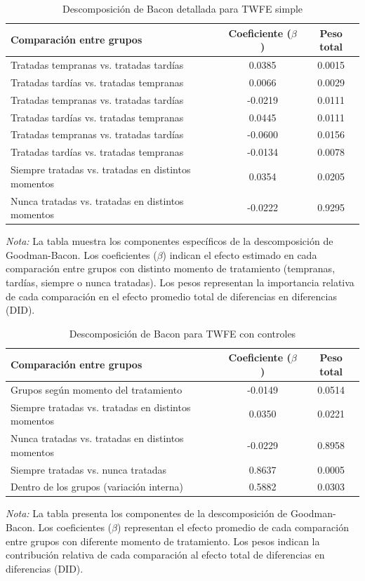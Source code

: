 \documentclass{article}
\begin{document}
\begin{table}[H]
\centering
\caption{Descomposición de Bacon detallada para TWFE simple}
\label{tab:bacon_detallada}
\begin{tabular}{lcc}
\hline
\hline
\textbf{Comparación entre grupos} & \textbf{Coeficiente ($\beta$)} & \textbf{Peso total} \\
\hline
Tratadas tempranas vs. tratadas tardías  & 0.0385 & 0.0015 \\
Tratadas tardías vs. tratadas tempranas  & 0.0066 & 0.0029 \\
Tratadas tempranas vs. tratadas tardías  & -0.0219 & 0.0111 \\
Tratadas tardías vs. tratadas tempranas  & 0.0445 & 0.0111 \\
Tratadas tempranas vs. tratadas tardías  & -0.0600 & 0.0156 \\
Tratadas tardías vs. tratadas tempranas & -0.0134 & 0.0078 \\
Siempre tratadas vs. tratadas en distintos momentos & 0.0354 & 0.0205 \\
Nunca tratadas vs. tratadas en distintos momentos & -0.0222 & 0.9295 \\
\hline
\end{tabular}
\parbox[t]{\textwidth}{%
\vspace{0.5em}
\footnotesize{\textit{Nota:} La tabla muestra los componentes específicos de la descomposición de Goodman-Bacon. Los coeficientes ($\beta$) indican el efecto estimado en cada comparación entre grupos con distinto momento de tratamiento (tempranas, tardías, siempre o nunca tratadas). Los pesos representan la importancia relativa de cada comparación en el efecto promedio total de diferencias en diferencias (DID).}}
\end{table}

\begin{table}[H]
\centering
\caption{Descomposición de Bacon para TWFE con controles}
\label{tab:bacon_descomposicion}
\begin{tabular}{lcc}
\hline
\hline
\textbf{Comparación entre grupos} & \textbf{Coeficiente ($\beta$)} & \textbf{Peso total} \\
\hline
Grupos según momento del tratamiento & -0.0149 & 0.0514 \\
Siempre tratadas vs. tratadas en distintos momentos & 0.0350 & 0.0221 \\
Nunca tratadas vs. tratadas en distintos momentos & -0.0229 & 0.8958 \\
Siempre tratadas vs. nunca tratadas & 0.8637 & 0.0005 \\
Dentro de los grupos (variación interna) & 0.5882 & 0.0303 \\
\hline
\end{tabular}
\parbox[t]{\textwidth}{%
\vspace{0.5em}
\footnotesize{\textit{Nota:} La tabla presenta los componentes de la descomposición de Goodman-Bacon. Los coeficientes ($\beta$) representan el efecto promedio de cada comparación entre grupos con diferente momento de tratamiento. Los pesos indican la contribución relativa de cada comparación al efecto total de diferencias en diferencias (DID).}}
\end{table}
\end{document}
